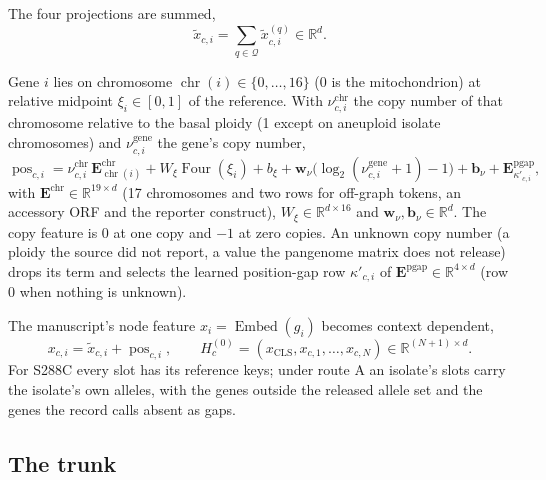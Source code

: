 The four projections are summed,
\begin{equation}
\tilde x_{c,i} = \sum_{q \in \mathcal{Q}} \tilde x^{(q)}_{c,i} \in \mathbb{R}^{d}.
\label{eq:composite}
\end{equation}

Gene $i$ lies on chromosome $\operatorname{chr}(i) \in \{0, \ldots, 16\}$ (0 is the
mitochondrion) at relative midpoint $\xi_i \in [0,1]$ of the reference. With $\nu^{\mathrm{chr}}_{c,i}$
the copy number of that chromosome relative to the basal ploidy (1 except on aneuploid
isolate chromosomes) and $\nu^{\mathrm{gene}}_{c,i}$ the gene's copy number,
\begin{equation}
\operatorname{pos}_{c,i} =
\nu^{\mathrm{chr}}_{c,i}\, \mathbf{E}^{\mathrm{chr}}_{\operatorname{chr}(i)}
+ W_{\xi} \operatorname{Four}(\xi_i) + b_{\xi}
+ \mathbf{w}_{\nu}\big(\log_2(\nu^{\mathrm{gene}}_{c,i} + 1) - 1\big) + \mathbf{b}_{\nu}
+ \mathbf{E}^{\mathrm{pgap}}_{\kappa'_{c,i}},
\label{eq:pos}
\end{equation}
with $\mathbf{E}^{\mathrm{chr}} \in \mathbb{R}^{19 \times d}$ (17 chromosomes and two rows for
off-graph tokens, an accessory ORF and the reporter construct), $W_{\xi} \in \mathbb{R}^{d
\times 16}$ and $\mathbf{w}_\nu, \mathbf{b}_\nu \in \mathbb{R}^{d}$. The copy feature is 0 at
one copy and $-1$ at zero copies. An unknown copy number (a ploidy the source did not report,
a value the pangenome matrix does not release) drops its term and selects the learned
position-gap row $\kappa'_{c,i}$ of $\mathbf{E}^{\mathrm{pgap}} \in \mathbb{R}^{4 \times d}$
(row 0 when nothing is unknown).

The manuscript's node feature $x_i = \operatorname{Embed}(g_i)$ becomes context dependent,
\begin{equation}
x_{c,i} = \tilde x_{c,i} + \operatorname{pos}_{c,i},
\qquad
H^{(0)}_c = (x_{\mathrm{CLS}}, x_{c,1}, \ldots, x_{c,N}) \in \mathbb{R}^{(N+1) \times d}.
\label{eq:token}
\end{equation}
For S288C every slot has its reference keys; under route A an isolate's slots carry the
isolate's own alleles, with the genes outside the released allele set and the genes the
record calls absent as gaps.

\subsection{The trunk}
\label{sec:trunk}

